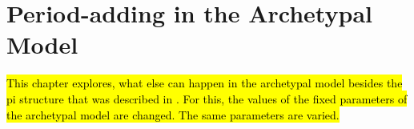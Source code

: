 \chapter{Period-adding in the Archetypal Model}
\label{chap:add}

\hl{
	This chapter explores, what else can happen in the archetypal model besides the \gls{pi} structure that was described in .
	For this, the values of the fixed parameters of the archetypal model are changed.
	The same parameters are varied.
}



\clearpage

